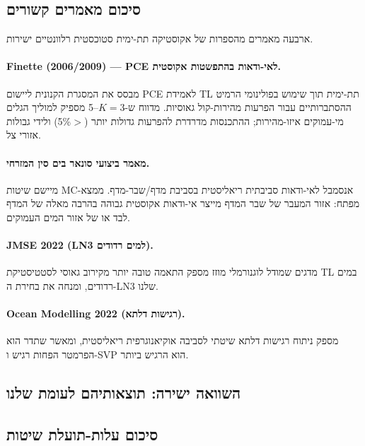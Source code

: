 \documentclass[12pt,a4paper]{article}
\begin{document}
\subsection{סיכום מאמרים קשורים}
\label{sec:papers}

ארבעה מאמרים מהספרות של אקוסטיקה תת-ימית סטוכסטית רלוונטיים ישירות.

\paragraph{\textenglish{Finette (2006/2009)} --- \textenglish{PCE} לאי-ודאות בהתפשטות אקוסטית.}
מבסס את המסגרת הקנונית ליישום \textenglish{PCE} לאמידת TL תת-ימית
תוך שימוש בפולינומי הרמיט ההסתברותיים עבור הפרעות מהירות-קול גאוסיות.
מדווח ש-$K=3$--5 מספיק למוליך הגלים מי-עמוקים איזו-מהירות; ההתכנסות מדרדרת
להפרעות גדולות יותר ($>$5\%{}) ולידי גבולות אזורי צל.

\paragraph{מאמר ביצועי סונאר בים סין המזרחי.}
מיישם שיטות MC-אנסמבל לאי-ודאות סביבתית ריאליסטית בסביבת מדף/שבר-מדף.
ממצא מפתח: אזור המעבר של שבר המדף מייצר אי-ודאות אקוסטית גבוהה בהרבה
מאלה של המדף לבד או של אזור המים העמוקים.

\paragraph{\textenglish{JMSE} 2022 (\textenglish{LN3} למים רדודים).}
מדגים שמודל לוגנורמלי מוזז מספק התאמה טובה יותר מקירוב גאוסי
לסטטיסטיקת TL במים רדודים, ומנחה את בחירת ה-\textenglish{LN3} שלנו.

\paragraph{\textenglish{Ocean Modelling} 2022 (רגישות דלתא).}
מספק ניתוח רגישות דלתא שיטתי לסביבה אוקיאנוגרפית ריאליסטית,
ומאשר שתדר הוא הפרמטר הפחות רגיש ו-SVP הוא הרגיש ביותר.

\subsection{השוואה ישירה: תוצאותיהם לעומת שלנו}



\subsection{סיכום עלות-תועלת שיטות}
\end{document}
